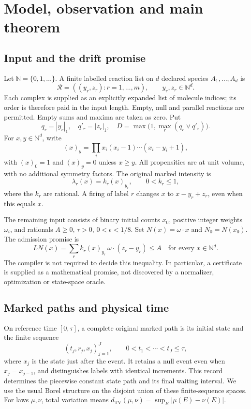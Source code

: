 \documentclass[11pt,reqno]{amsart}
\theoremstyle{definition}
\theoremstyle{remark}
\newcommand{\N}{\mathbb N}
\newcommand{\TV}{d_{\mathrm{TV}}}
\begin{document}
\section{Model, observation and main theorem}\label{sec:model}
\subsection{Input and the drift promise}
Let $\N=\{0,1,\ldots\}$. A finite labelled reaction list on $d$ declared species
$A_1,\ldots,A_d$ is
\[
 \mathcal R=((y_r,z_r):r=1,\ldots,m),\qquad y_r,z_r\in\N^d.
\]
Each complex is supplied as an explicitly expanded list of molecule indices;
its order is therefore paid in the input length. Empty, null and parallel
reactions are permitted. Empty sums and maxima are taken as zero. Put
\[
 q_r=|y_r|_1,\quad q'_r=|z_r|_1,\quad
 D=\max\bigl(1,\max_r(q_r\vee q'_r)\bigr).
\]
For $x,y\in\N^d$, write
\[
 (x)_y=\prod_i x_i(x_i-1)\cdots(x_i-y_i+1),
\]
with $(x)_0=1$ and $(x)_y=0$ unless $x\ge y$. All propensities are at unit
volume, with no additional symmetry factors. The original marked intensity is
\begin{equation}\label{eq:original-rate}
 \lambda_r(x)=k_r(x)_{y_r},\qquad 0<k_r\le1,
\end{equation}
where the $k_r$ are rational. A firing of label $r$ changes $x$ to
$x-y_r+z_r$, even when this equals $x$.

The remaining input consists of binary initial counts $x_0$, positive integer
weights $\omega_i$, and rationals $A\ge0$, $\tau>0$, $0<\epsilon<1/8$.
Set $N(x)=\omega\cdot x$ and $N_0=N(x_0)$. The admission promise is
\begin{equation}\label{eq:drift-promise}
 LN(x)=\sum_r k_r(x)_{y_r}\,\omega\cdot(z_r-y_r)\le A
 \quad\text{for every }x\in\N^d.
\end{equation}
The compiler is not required to decide this inequality. In particular, a
certificate is supplied as a mathematical promise, not discovered by a
normalizer, optimization or state-space oracle.

\subsection{Marked paths and physical time}
On reference time $[0,\tau]$, a complete original marked path is its initial
state and the finite sequence
\begin{equation}\label{eq:marked-record}
 (t_j,r_j,x_j)_{j=1}^{J},\qquad
 0<t_1<\cdots<t_J\le\tau,
\end{equation}
where $x_j$ is the state just after the event. It retains a null event even
when $x_j=x_{j-1}$, and distinguishes labels with identical increments. This
record determines the piecewise constant state path and its final waiting
interval. We use the usual Borel structure on the disjoint union of these
finite-sequence spaces. For laws $\mu,\nu$, total variation means
$\TV(\mu,\nu)=\sup_E|\mu(E)-\nu(E)|$.
\end{document}
